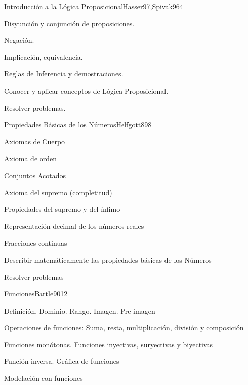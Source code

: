 \begin{sumilla}
\begin{outcomes}
\end{outcomes}

\begin{unit}{Introducci\'on a la L\'ogica Proposicional}{Hasser97,Spivak96}{4}
\begin{topicos}
      \item Disyunci\'on y conjunci\'on de proposiciones.
      \item Negaci\'on.
      \item Implicaci\'on, equivalencia.
      \item Reglas de Inferencia y demostraciones.
   \end{topicos}

   \begin{objetivos}
      \item Conocer y aplicar conceptos de L\'ogica Proposicional.
	\item Resolver problemas.
   \end{objetivos}
\end{unit}

\begin{unit}{Propiedades B\'asicas de los N\'umeros}{Helfgott89}{8}
\begin{topicos}
	\item Axiomas de Cuerpo
	\item Axioma de orden
	\item Conjuntos Acotados
	\item Axioma del supremo  (completitud)
	\item Propiedades del supremo y del \'infimo
	\item Representaci\'on decimal de los n\'umeros reales
	\item Fracciones continuas
\end{topicos}
\begin{objetivos}
	\item Describir matem\'aticamente las propiedades b\'asicas de los N\'umeros
	\item Resolver problemas
\end{objetivos}
\end{unit}

\begin{unit}{Funciones}{Bartle90}{12}
\begin{topicos}
      \item Definici\'on. Dominio. Rango. Imagen. Pre imagen
      \item Operaciones de funciones: Suma, resta, multiplicaci\'on, divisi\'on y composici\'on
      \item Funciones mon\'otonas. Funciones inyectivas,  suryectivas y biyectivas
      \item Funci\'on inversa. Gr\'afica de funciones
      \item Modelaci\'on con funciones
\end{topicos}


\end{unit}
\end{sumilla}
